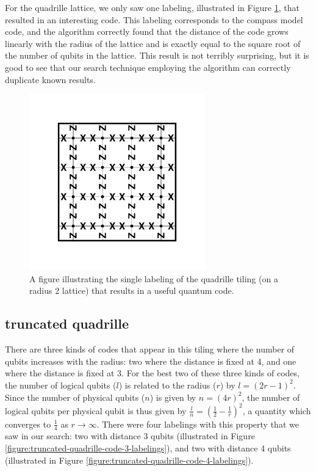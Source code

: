 \documentclass{amsbook}
\theoremstyle{plain}
\theoremstyle{definition}
\theoremstyle{remark}
\newcommand{\half}{\frac{1}{2}}
\newcommand{\paren}[1]{\left(#1\right)}
\begin{document}
For the quadrille lattice, we only saw one labeling, illustrated in Figure \ref{figure:quadrille-code-labeling}, that resulted in an interesting code.  This labeling corresponds to the compass model code, and the algorithm correctly found that the distance of the code grows linearly with the radius of the lattice and is exactly equal to the square root of the number of qubits in the lattice.  This result is not terribly surprising, but it is good to see that our search technique employing the algorithm can correctly duplicate known results.

\begin{figure}
\includegraphics[width=3in]{images/quadrille-code-labeling}
\caption{
\label{figure:quadrille-code-labeling}
A figure illustrating the single labeling of the quadrille tiling (on a radius 2 lattice) that results in a useful quantum code.
}
\end{figure}
\subsection{truncated quadrille}

There are three kinds of codes that appear in this tiling where the number of qubits increases with the radius:  two where the distance is fixed at 4, and one where the distance is fixed at 3.  For the best two of these three kinds of codes, the number of logical qubits ($l$) is related to the radius ($r$) by $l=(2r-1)^2$.    Since the number of physical qubits ($n$) is given by $n=(4r)^2$, the number of logical qubits per physical qubit is thus given by $\frac{l}{n}=\paren{\half-\frac{1}{r}}^2$, a quantity which converges to $\frac{1}{4}$ as $r\to\infty$.  There were four labelings with this property that we saw in our search:  two with distance 3 qubits (illustrated in Figure \ref{figure:truncated-quadrille-code-3-labelings}), and two with distance 4 qubits (illustrated in Figure \ref{figure:truncated-quadrille-code-4-labelings}).
\end{document}
